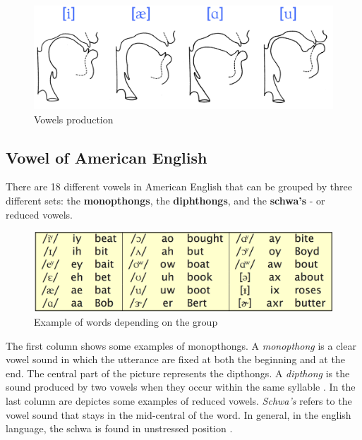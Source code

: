 \begin{figure}[!ht]
    \centering
    \includegraphics[scale=0.5]{Figures/vowels_prod.png}
    \caption{Vowels production \cite{mit_phonetics}}
    \label{fig:vowels_prod}
\end{figure}

\subsection{Vowel of American English}
\label{sub:vowel_of_american_english}
There are 18 different vowels in American English that can be grouped by three different sets: the \textbf{monopthongs}, the \textbf{diphthongs}, and the \textbf{schwa's} - or reduced vowels.

\begin{figure}[!ht]
    \centering
    \includegraphics[scale=0.5]{Figures/vowels_sets.png}
    \caption{Example of words depending on the group \cite{mit_phonetics}}
    \label{fig:vowels_sets}
\end{figure}

The first column shows some examples of monopthongs. A \textit{monopthong} is a clear vowel sound in which the utterance are fixed at both the beginning and at the end. The central part of the picture represents the dipthongs. A \textit{dipthong} is the sound produced by two vowels when they occur within the same syllable \cite{dipthong_wiki}. In the last column are depictes some examples of reduced vowels. \textit{Schwa's} refers to the vowel sound that stays in the mid-central of the word. In general, in the english language, the schwa is found in unstressed position \cite{schwa_wiki}.

